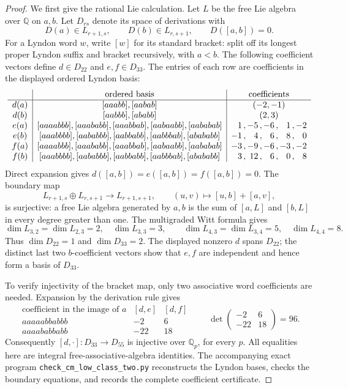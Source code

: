 \begin{proof}
We first give the rational Lie calculation.
Let \(L\) be the free Lie algebra over \(\mathbb Q\) on \(a,b\).
Let \(D_{rs}\) denote its space of derivations with
\[
 D(a)\in L_{r+1,s},\qquad D(b)\in L_{r,s+1},\qquad
                         D([a,b])=0.
\]
For a Lyndon word \(w\), write \([w]\) for its standard bracket:
split off its longest proper Lyndon suffix and bracket
recursively, with \(a<b\).
The following coefficient vectors define \(d\in D_{22}\) and
\(e,f\in D_{33}\).  The entries of each row are coefficients in
the displayed ordered Lyndon basis:
\[
\begin{array}{c|c|r@{\,,\,}r@{\,,\,}r@{\,,\,}r@{\,,\,}r}
 &\text{ordered basis}&\multicolumn{5}{c}{\text{coefficients}}\\ \hline
d(a)&[aaabb],[aabab]&\multicolumn{5}{c}{(-2,-1)}\\
d(b)&[aabbb],[ababb]&\multicolumn{5}{c}{(2,3)}\\
e(a)&[aaaabbb],[aaababb],[aaabbab],[aabaabb],[aababab]
       &1&-5&-6&1&-2\\
e(b)&[aaabbbb],[aababbb],[aabbabb],[aabbbab],[abababb]
       &-1&4&6&8&0\\
f(a)&[aaaabbb],[aaababb],[aaabbab],[aabaabb],[aababab]
       &-3&-9&-6&-3&-2\\
f(b)&[aaabbbb],[aababbb],[aabbabb],[aabbbab],[abababb]
       &3&12&6&0&8
\end{array}
\]
Direct expansion gives
\(d([a,b])=e([a,b])=f([a,b])=0\).
The boundary map
\[
 L_{r+1,s}\oplus L_{r,s+1}\longrightarrow L_{r+1,s+1},
 \qquad (u,v)\longmapsto[u,b]+[a,v],
\]
is surjective: a free Lie algebra generated by \(a,b\) is the
sum of \([a,L]\) and \([b,L]\) in every degree greater than one.
The multigraded Witt formula gives
\[
 \dim L_{3,2}=\dim L_{2,3}=2,\quad \dim L_{3,3}=3,
 \qquad
 \dim L_{4,3}=\dim L_{3,4}=5,\quad \dim L_{4,4}=8.
\]
Thus \(\dim D_{22}=1\) and \(\dim D_{33}=2\).
The displayed nonzero \(d\) spans \(D_{22}\);
the distinct last two \(b\)-coefficient vectors show that \(e,f\)
are independent and hence form a basis of \(D_{33}\).

To verify injectivity of the bracket map, only two associative
word coefficients are needed.  Expansion by the derivation rule
gives
\[
\begin{array}{c|rr}
 \text{coefficient in the image of }a &[d,e]&[d,f]\\ \hline
 aaaaabbabbb&-2&6\\
 aaaababbabb&-22&18
\end{array}
\qquad
\det\begin{pmatrix}-2&6\\-22&18\end{pmatrix}=96.
\]
Consequently \([d,\cdot]:D_{33}\longrightarrow D_{55}\) is
injective over \(\mathbb Q_p\), for every \(p\).
All equalities here are integral free-associative-algebra
identities.  The accompanying exact program
\texttt{check\_cm\_low\_class\_two.py} reconstructs the Lyndon
bases, checks the boundary equations, and records the complete
coefficient certificate.


\end{proof}
